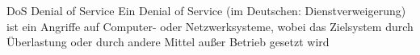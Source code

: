 {DoS}%
{Denial of Service}%
{Ein Denial of Service (im Deutschen: Dienstverweigerung) ist ein Angriffe auf Computer- oder Netzwerksysteme, wobei das Zielsystem durch Überlastung oder durch andere Mittel außer Betrieb gesetzt wird}%
